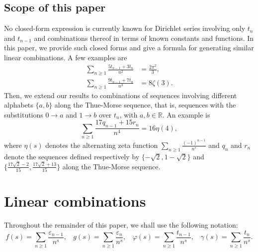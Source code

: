 \documentclass[12pt,reqno]{article}
\begin{document}
\subsection{Scope of this paper}

No closed-form expression is currently known for Dirichlet series involving only $t_n$ and $t_{n-1}$ and combinations thereof in terms of known constants and functions. In this paper, we provide such closed forms and give a  formula for generating similar linear combinations. A few examples are
\begin{align*}
	\sum_{n\geq1} \frac{5 t_{n-1} + 3 t_n}{n^2} &= \frac{2 \pi^2}{3}, \\
	\sum_{n\geq1} \frac{9 t_{n-1} + 7 t_n}{n^3} &= 8 \zeta(3).
\end{align*}
Then, we extend our results to combinations of sequences involving different alphabets $\{a,b\}$ along the Thue-Morse sequence, that is, sequences with the substitutions $0\to a$ and $1\to b$ over $t_n$, with $a,b\in\mathbb{R}$. An example is
$$
\sum_{n\geq1} \frac{17 q_{n-1} + 15 r_n}{n^4} = 16 \eta(4),
$$
where $\eta(s)$ denotes the alternating zeta function $\sum_{n\geq1} \frac{(-1)^{n-1}}{n^s}$ and $q_n$ and $r_n$ denote the sequences defined respectively by $\{-\sqrt2,1-\sqrt2\}$ and $\{\frac{17\sqrt2 -2}{15},\frac{17\sqrt2 +13}{15}\}$ along the Thue-Morse sequence.

\section{Linear combinations}
Throughout the remainder of this paper, we shall use the following notation:
$$
f(s)=\sum_{n\geq1} \frac{\varepsilon_{n-1}}{n^s}, \ \ \ \  g(s) = \sum_{n\geq1} \frac{\varepsilon_n}{n^s}, \ \ \ \  \varphi(s) = \sum_{n\geq1} \frac{t_{n-1}}{n^s}, \ \ \ \  \gamma(s) = \sum_{n\geq1} \frac{t_n}{n^s}.
$$
\end{document}

